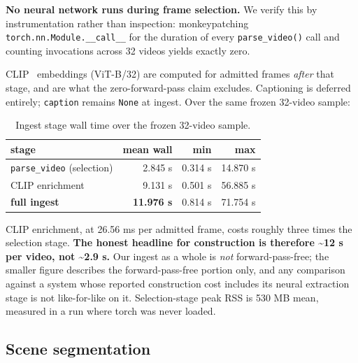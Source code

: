 \documentclass[sigconf,review,anonymous]{acmart}
\begin{document}
\textbf{No neural network runs during frame selection.} We verify this by instrumentation rather
than inspection: monkeypatching \texttt{torch.nn.Module.\_\_call\_\_} for the duration of every
\texttt{parse\_video()} call and counting invocations across 32 videos yields exactly zero.

CLIP~\cite{radford2021clip} embeddings (ViT-B/32) are computed for admitted frames \emph{after} that stage, and are what
the zero-forward-pass claim excludes. Captioning is deferred entirely; \texttt{caption} remains
\texttt{None} at ingest. Over the same frozen 32-video sample:

\begin{table}[t]
\footnotesize
\setlength{\tabcolsep}{4pt}
\caption{Ingest stage wall time over the frozen 32-video sample.}
\begin{tabular}{lrrr}
\toprule
stage & mean wall & min & max \\
\midrule
\texttt{parse\_video} (selection) & 2.845 s & 0.314 s & 14.870 s \\
CLIP enrichment & 9.131 s & 0.501 s & 56.885 s \\
\textbf{full ingest} & \textbf{11.976 s} & 0.814 s & 71.754 s \\
\bottomrule
\end{tabular}
\end{table}

CLIP enrichment, at 26.56 ms per admitted frame, costs roughly three times the selection stage.
\textbf{The honest headline for construction is therefore \textasciitilde12 s per video, not \textasciitilde2.9 s.} Our ingest
as a whole is \emph{not} forward-pass-free; the smaller figure describes the forward-pass-free
portion only, and any comparison against a system whose reported construction cost includes
its neural extraction stage is not like-for-like on it. Selection-stage peak RSS is 530 MB
mean, measured in a run where torch was never loaded.

\subsection{Scene segmentation}
\end{document}
